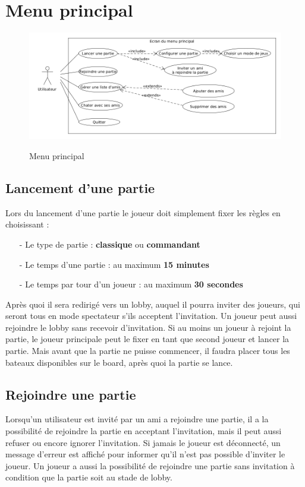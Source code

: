 \documentclass[../besoin_user.tex]{subfiles}
\begin{document}
\section{Menu principal}
\begin{figure}[h]
    \centering
    \includegraphics[scale=0.5]{img_fonctionnel/use_case_user_ecran_principal.png}
    \label{fig:user_menu_principal}
    \caption{Menu principal}
\end{figure}

\subsection{Lancement d'une partie}
Lors du lancement d'une partie le joueur doit simplement fixer les règles en choisissant :
\begin{itemize}
	\item[-] Le type de partie : \textbf{classique} ou \textbf{commandant}
	\item[-] Le temps d'une partie : au maximum \textbf{15 minutes}
	\item[-] Le temps par tour d'un joueur : au maximum \textbf{30 secondes}
\end{itemize}

Après quoi il sera redirigé vers un lobby, auquel il pourra inviter des joueurs, qui seront tous en mode spectateur s'ils acceptent l'invitation.
Un joueur peut aussi rejoindre le lobby sans recevoir d'invitation.
Si au moins un joueur à rejoint la partie, le joueur principale peut le fixer en tant que second joueur et lancer la partie.
Mais avant que la partie ne puisse commencer, il faudra placer tous les bateaux disponibles sur le board, après quoi la partie se lance.

\subsection{Rejoindre une partie}
Lorsqu'un utilisateur est invité par un ami a rejoindre une partie, il a la possibilité de rejoindre la partie en acceptant l'invitation, mais il peut aussi refuser
ou encore ignorer l'invitation. Si jamais le joueur est déconnecté, un message d'erreur est affiché pour informer qu'il n'est pas possible d'inviter le joueur.
Un joueur a aussi la possibilité de rejoindre une partie sans invitation à condition que la partie soit au stade de lobby.
\end{document}
